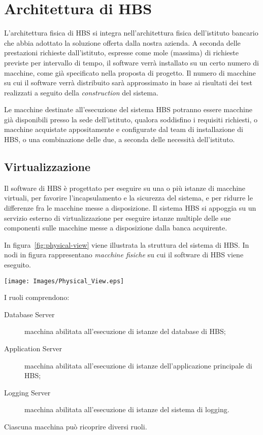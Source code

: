 
\section{Architettura di HBS}

L'architettura fisica di HBS si integra nell'architettura fisica dell'istituto bancario che abbia adottato la soluzione offerta dalla nostra azienda.
A seconda delle prestazioni richieste dall'istituto, espresse come mole (massima) di richieste previste per intervallo di tempo, il software verr\`a installato su un certo numero di macchine, come gi\`a specificato nella proposta di progetto.
Il numero di macchine su cui il software verr\`a distribuito sar\`a approssimato in base ai risultati dei test realizzati a seguito della \emph{construction} del sistema.

Le macchine destinate all'esecuzione del sistema HBS potranno essere macchine gi\`a disponibili presso la sede dell'istituto, qualora soddisfino i requisiti richiesti, o macchine acquistate appositamente e configurate dal team di installazione di HBS, o una combinazione delle due, a seconda delle necessit\`a dell'istituto.

\subsection{Virtualizzazione}

Il software di HBS \`e progettato per eseguire su una o pi\`u istanze di macchine virtuali, per favorire l'incapsulamento e la sicurezza del sistema, e per ridurre le differenze fra le macchine messe a disposizione.
Il sistema HBS si appoggia su un servizio esterno di virtualizzazione per eseguire istanze multiple delle sue componenti sulle macchine messe a disposizione dalla banca acquirente.

In figura~\ref{fig:physical-view} viene illustrata la struttura del sistema di HBS.
In nodi in figura rappresentano \emph{macchine fisiche} su cui il software di HBS viene eseguito.

\begin{figure*}[h]
	\centering
	\texttt{[image: Images/Physical\_View.eps]}
	\caption{Diagramma di deployment del sistema.}
	\label{fig:physical-view}
\end{figure*}

I ruoli comprendono:
\begin{description}
	\item[Database Server] macchina abilitata all'esecuzione di istanze del database di HBS;

	\item[Application Server] macchina abilitata all'esecuzione di istanze dell'applicazione principale di HBS;

	\item[Logging Server] macchina abilitata all'esecuzione di istanze del sistema di logging.
\end{description}
Ciascuna macchina pu\`o ricoprire diversi ruoli.

